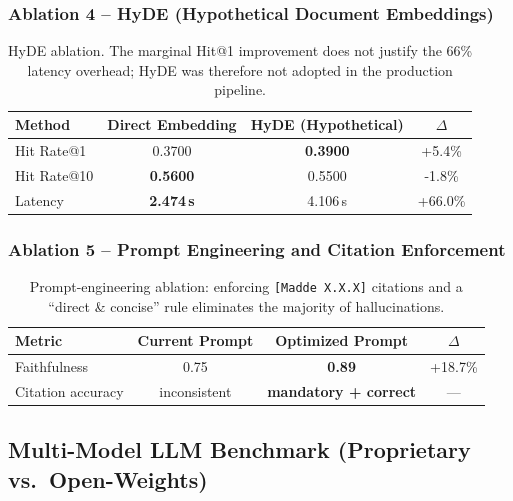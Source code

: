\documentclass[11pt, a4paper]{article}
\begin{document}
\subsubsection{Ablation 4 -- HyDE (Hypothetical Document Embeddings)}

\begin{table}[H]
    \centering
    \small
    \begin{tabular}{lccc}
        \toprule
        \textbf{Method} & \textbf{Direct Embedding} & \textbf{HyDE (Hypothetical)} & \textbf{$\Delta$}\\
        \midrule
        Hit Rate@1  & 0.3700 & \textbf{0.3900} & +5.4\%\\
        Hit Rate@10 & \textbf{0.5600} & 0.5500 & -1.8\%\\
        Latency     & \textbf{2.474\,s} & 4.106\,s & +66.0\%\\
        \bottomrule
    \end{tabular}
    \caption{HyDE ablation. The marginal Hit@1 improvement does not justify the 66\% latency overhead; HyDE was therefore not adopted in the production pipeline.}
\end{table}

\subsubsection{Ablation 5 -- Prompt Engineering and Citation Enforcement}

\begin{table}[H]
    \centering
    \small
    \begin{tabular}{lccc}
        \toprule
        \textbf{Metric} & \textbf{Current Prompt} & \textbf{Optimized Prompt} & \textbf{$\Delta$}\\
        \midrule
        Faithfulness   & 0.75 & \textbf{0.89} & +18.7\%\\
        Citation accuracy & inconsistent & \textbf{mandatory + correct} & --- \\
        \bottomrule
    \end{tabular}
    \caption{Prompt-engineering ablation: enforcing \texttt{[Madde X.X.X]} citations and a ``direct \& concise'' rule eliminates the majority of hallucinations.}
\end{table}

\subsection{Multi-Model LLM Benchmark (Proprietary vs.\ Open-Weights)}
\end{document}
